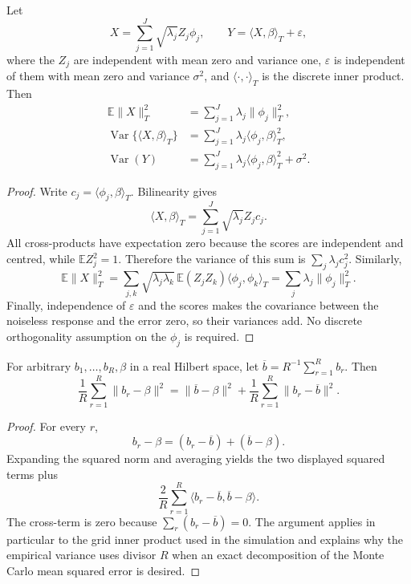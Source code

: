 \begin{proposition}
\label{prop:app-simulation-variance}
Let
\[
 X=\sum_{j=1}^{J}\sqrt{\lambda_j}Z_j\phi_j,
 \qquad
 Y=\langle X,\beta\rangle_T+\varepsilon,
\]
where the $Z_j$ are independent with mean zero and variance one,
$\varepsilon$ is independent of them with mean zero and variance $\sigma^2$,
and $\langle\cdot,\cdot\rangle_T$ is the discrete inner product.  Then
\begin{align*}
 \mathbb E\|X\|_T^2
 &=\sum_{j=1}^{J}\lambda_j\|\phi_j\|_T^2,\\
 \operatorname{Var}\{\langle X,\beta\rangle_T\}
 &=\sum_{j=1}^{J}\lambda_j
   \langle\phi_j,\beta\rangle_T^2,\\
 \operatorname{Var}(Y)
 &=\sum_{j=1}^{J}\lambda_j
   \langle\phi_j,\beta\rangle_T^2+\sigma^2.
\end{align*}
\end{proposition}

\begin{proof}
Write $c_j=\langle\phi_j,\beta\rangle_T$.  Bilinearity gives
\[
 \langle X,\beta\rangle_T
 =\sum_{j=1}^{J}\sqrt{\lambda_j}Z_jc_j.
\]
All cross-products have expectation zero because the scores are independent
and centred, while $\mathbb E Z_j^2=1$.  Therefore the variance of this sum is
$\sum_j\lambda_jc_j^2$.  Similarly,
\[
 \mathbb E\|X\|_T^2
 =\sum_{j,k}\sqrt{\lambda_j\lambda_k}\,
   \mathbb E(Z_jZ_k)\langle\phi_j,\phi_k\rangle_T
 =\sum_j\lambda_j\|\phi_j\|_T^2.
\]
Finally, independence of $\varepsilon$ and the scores makes the covariance
between the noiseless response and the error zero, so their variances add.
No discrete orthogonality assumption on the $\phi_j$ is required.
\end{proof}

\begin{proposition}
\label{prop:app-mc-decomposition}
For arbitrary $b_1,\ldots,b_R,\beta$ in a real Hilbert space, let
$\overline b=R^{-1}\sum_{r=1}^{R}b_r$.  Then
\[
 \frac1R\sum_{r=1}^{R}\|b_r-\beta\|^2
 =\|\overline b-\beta\|^2
  +\frac1R\sum_{r=1}^{R}\|b_r-\overline b\|^2.
\]
\end{proposition}

\begin{proof}
For every $r$,
\[
 b_r-\beta=(b_r-\overline b)+(\overline b-\beta).
\]
Expanding the squared norm and averaging yields the two displayed squared
terms plus
\[
 \frac{2}{R}\sum_{r=1}^{R}
 \langle b_r-\overline b,\overline b-\beta\rangle.
\]
The cross-term is zero because
$\sum_r(b_r-\overline b)=0$.  The argument applies in particular to the
grid inner product used in the simulation and explains why the empirical
variance uses divisor $R$ when an exact decomposition of the Monte Carlo mean
squared error is desired.
\end{proof}

